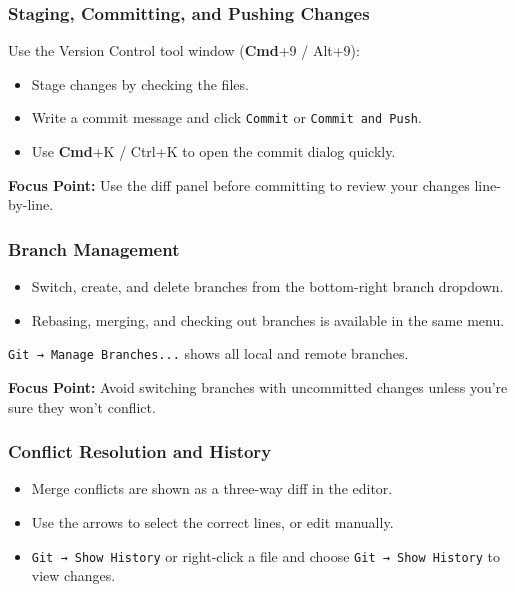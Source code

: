 \documentclass[a4paper,12pt]{article}
\begin{document}
\subsubsection{Staging, Committing, and Pushing Changes}

Use the Version Control tool window (\textbf{Cmd}+9 / Alt+9):
\begin{itemize}
  \item Stage changes by checking the files.
  \item Write a commit message and click \texttt{Commit} or \texttt{Commit and Push}.
  \item Use \textbf{Cmd}+K / Ctrl+K to open the commit dialog quickly.
\end{itemize}

\textbf{Focus Point:} Use the diff panel before committing to review your changes line-by-line.

\subsubsection{Branch Management}

\begin{itemize}
  \item Switch, create, and delete branches from the bottom-right branch dropdown.
  \item Rebasing, merging, and checking out branches is available in the same menu.
\end{itemize}

\texttt{Git → Manage Branches...} shows all local and remote branches.

\textbf{Focus Point:} Avoid switching branches with uncommitted changes unless you're sure they won’t conflict.

\subsubsection{Conflict Resolution and History}

\begin{itemize}
  \item Merge conflicts are shown as a three-way diff in the editor.
  \item Use the arrows to select the correct lines, or edit manually.
  \item \texttt{Git → Show History} or right-click a file and choose \texttt{Git → Show History} to view changes.
\end{itemize}
\end{document}

